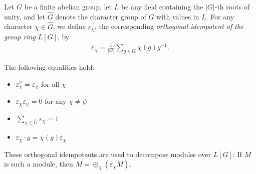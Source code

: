 \documentclass[12pt]{article}
\newcommand{\<}{\langle}
\renewcommand{\>}{\rangle}
\begin{document}
Let $G$ be a finite abelian group, let $L$ be any field containing the $|G|$-th roots of unity, and let $\hat{G}$ denote the character group of $G$ with values in $L$.  For any character $\chi\in \hat{G}$, we define $\varepsilon_\chi$, the corresponding \emph{orthogonal idempotent of the group ring} $L[G]$, by
\begin{align*}
\varepsilon_\chi=\frac{1}{|G|}\sum_{g\in G} \chi(g)g^{-1}.
\end{align*}

The following equalities hold:
\begin{itemize}
\item $\varepsilon_\chi^2=\varepsilon_\chi$ for all $\chi$
\item $\varepsilon_\chi\varepsilon_\psi=0$ for any $\chi\neq\psi$
\item $\sum_{\chi\in\hat{G}}\varepsilon_\chi=1$
\item $\varepsilon_\chi\cdot g=\chi(g)\varepsilon_\chi$
\end{itemize}

These orthogonal idempotents are used to decompose modules over $L[G]$:  If $M$ is such a module, then $M=\oplus_\chi (\varepsilon_\chi M)$.
\end{document}
